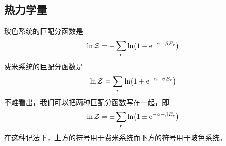 \documentclass[../../main.tex]{subfiles}
\begin{document}
\subsection{热力学量}
玻色系统的巨配分函数是
\begin{equation}
    \ln\mathcal{Z}=-\sum_r \ln(1-\mathrm{e}^{-\alpha-\beta E_r})
\end{equation}
费米系统的巨配分函数是
\begin{equation}
    \ln\mathcal{Z}=\sum_r \ln(1+\mathrm{e}^{-\alpha-\beta E_r})
\end{equation}
不难看出，我们可以把两种巨配分函数写在一起，即
\begin{equation}
    \ln\mathcal{Z}=\pm\sum_r \ln(1\pm\mathrm{e}^{-\alpha-\beta E_r})
\end{equation}
在这种记法下，上方的符号用于费米系统而下方的符号用于玻色系统。
\end{document}
